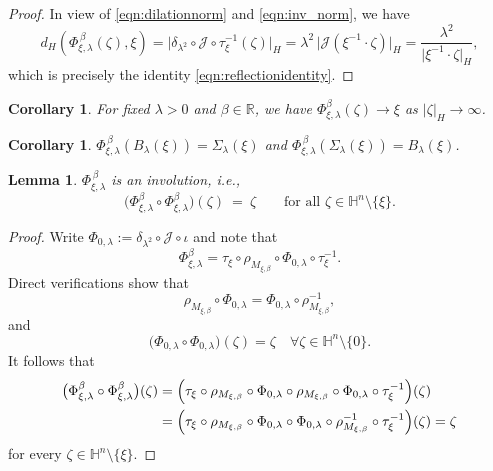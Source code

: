 \documentclass[reqno]{amsart}
\newtheorem{cor}[thm]{Corollary}
\newtheorem{lem}[thm]{Lemma}
\theoremstyle{definition}
\theoremstyle{remark}
\numberwithin{equation}{section}
\begin{document}
\begin{proof}
In view of \eqref{eqn:dilationnorm} and \eqref{eqn:inv_norm}, we have
\begin{equation*}\label{eqn:reflectionform}
d_{\! H}\! \left(\Phi_{\xi, \lambda}^{\, \beta} (\zeta), \xi\right)
= \bigl|\delta_{\lambda^{2}} \circ \mathscr{J} \circ \tau_{\xi}^{-1}(\zeta)\bigr|_{\! H}
= \lambda^{2}\,\bigl|\mathscr{J} (\xi^{-1}\cdot\zeta)\bigr|_{\! H}
= \frac{\lambda^{2}}{\bigl|\xi^{-1}\cdot\zeta\bigr|_{\! H}},
\end{equation*}
which is precisely the identity \eqref{eqn:reflectionidentity}.
\end{proof}

\begin{cor}\label{cor:gndCRinv1}
For fixed $\lambda>0$ and $\beta\in \mathbb{R}$, we have $\Phi_{\xi,\lambda}^{\beta} (\zeta) \to \xi$ as $|\zeta|_{\! H}\to \infty$.
\end{cor}

\begin{cor}\label{cor:gndCRinv2}
$\Phi_{\xi, \lambda}^{\, \beta} \left(B_{\lambda}(\xi)\right)=\Sigma_{\lambda}(\xi)$ and $\Phi_{\xi, \lambda}^{\, \beta} \left(\Sigma_{\lambda}(\xi)\right)=B_{\lambda}(\xi)$.
\end{cor}

\begin{lem}\label{lem:gndCRinv2}
$\Phi_{\xi, \lambda}^{\, \beta}$ is an involution, i.e., 
\[
\bigl( \Phi_{\xi,\lambda}^{\beta} \circ \Phi_{\xi,\lambda}^{\beta} \bigr)(\zeta) ~=~ \zeta 
\qquad\text{for all } \zeta\in \mathbb{H}^n\setminus \{\xi\}.
\]
\end{lem}

\begin{proof}
Write $\Phi_{0,\lambda} := \delta_{\lambda^2} \circ \mathscr{J} \circ \iota$ and note that
\[
\Phi_{\xi,\lambda}^{\beta} = \tau_{\xi} \circ \rho_{M_{\xi,\beta}} \circ \Phi_{0,\lambda} \circ \tau_{\xi}^{-1}.
\]
Direct verifications show that
\[
\rho_{M_{\xi,\beta}} \circ \Phi_{0,\lambda} = \Phi_{0,\lambda} \circ \rho_{M_{\xi,\beta}}^{-1},
\]
and 
\[
\bigl( \Phi_{0,\lambda} \circ \Phi_{0,\lambda} \bigr)(\zeta) = \zeta \quad \forall \zeta \in \mathbb{H}^n \setminus \{0\}.
\]
It follows that
\begin{align*}
\bigl( \Phi_{\xi,\lambda}^{\beta} \circ \Phi_{\xi,\lambda}^{\beta} \bigr)(\zeta)
&= \Bigl( \tau_{\xi} \circ \rho_{M_{\xi,\beta}} \circ \Phi_{0,\lambda} \circ \rho_{M_{\xi,\beta}} \circ \Phi_{0,\lambda} \circ \tau_{\xi}^{-1} \Bigr)(\zeta) \\
&= \Bigl( \tau_{\xi} \circ \rho_{M_{\xi,\beta}} \circ \Phi_{0,\lambda} \circ \Phi_{0,\lambda} \circ \rho_{M_{\xi,\beta}}^{-1} \circ \tau_{\xi}^{-1} \Bigr)(\zeta) = \zeta
\end{align*}
for every $\zeta \in \mathbb{H}^n \setminus \{\xi\}$.
\end{proof}
\end{document}
